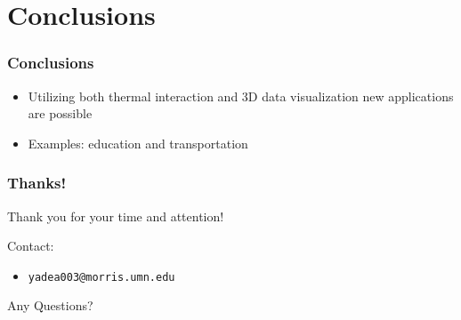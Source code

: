 \documentclass{beamer}
\newcommand{\linespace}{\vskip 0.25cm}
\begin{document}
\section[Conclusions]{Conclusions}
\begin{frame}
\frametitle{Conclusions}
	\begin{itemize}
		\item Utilizing both thermal interaction and 3D data visualization new applications are possible
		\item Examples: education and transportation

	\end{itemize}
\end{frame}

\begin{frame}
	\frametitle{Thanks!}
	
	Thank you for your time and attention!
		
	\linespace
	\linespace
	
	Contact:  
	\begin{itemize}
		\item \texttt{yadea003@morris.umn.edu}
	\end{itemize}
	
	\linespace
	\linespace
	
	\begin{center}
	{\huge Any Questions?}
	\end{center}
\end{frame}
\end{document}
